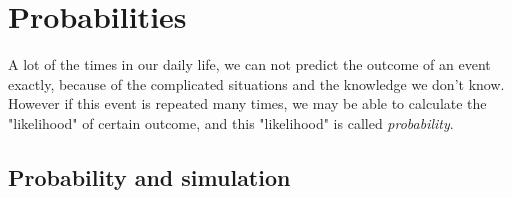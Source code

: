 \documentclass[a4paper, 12pt,twoside]{book}
\begin{document}
\pagestyle{fancy}
\fancyhf{}
\renewcommand{\chaptermark}[1]{ \markboth{#1}{} }
\fancyhead[CE,CO]{\leftmark}
\fancyfoot[LE,RO]{\thepage}

\chapter{Probabilities}

A lot of the times in our daily life, we can not predict the outcome of an event exactly, because of the complicated situations and the knowledge we don't know. However if this event is repeated many times, we may be able to calculate the "likelihood" of certain outcome, and this "likelihood" is called \textit{probability}.
\newpage

\section{\large{Probability and simulation}}
\vspace{0.3cm}
\end{document}
